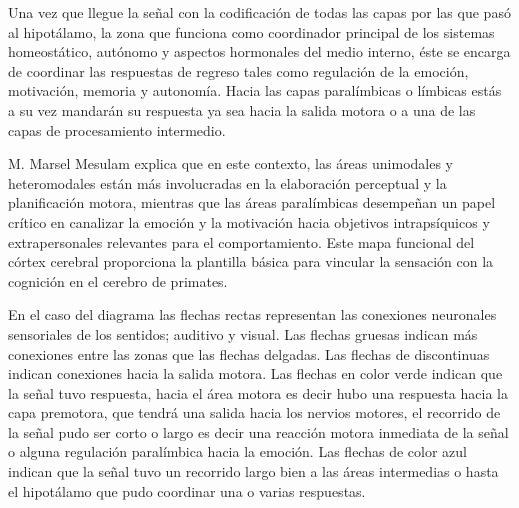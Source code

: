 Una vez que llegue la señal con la codificación de todas las capas por las que pasó al hipotálamo, la zona que funciona como coordinador principal de los sistemas homeostático, autónomo y
aspectos hormonales del medio interno, éste se encarga de coordinar las respuestas de regreso tales como regulación de la emoción, motivación, memoria y autonomía. Hacia las capas paralímbicas o límbicas estás a su vez mandarán su respuesta ya sea hacia la salida motora o a una de las capas de procesamiento intermedio.

M. Marsel Mesulam explica que en este contexto, las áreas unimodales y heteromodales están más involucradas en la elaboración perceptual y la planificación motora, mientras que las áreas paralímbicas desempeñan un papel crítico en canalizar la emoción y la motivación hacia objetivos intrapsíquicos y extrapersonales relevantes para el comportamiento. Este mapa funcional del córtex cerebral proporciona la plantilla básica para vincular la sensación con la cognición en el cerebro de primates.

En el caso del diagrama  las flechas rectas representan las conexiones neuronales sensoriales de los sentidos; auditivo y visual. Las flechas gruesas indican más conexiones entre las zonas que las flechas delgadas. Las flechas de discontinuas indican conexiones hacia la salida motora. Las flechas en color verde indican que la señal tuvo respuesta, hacia el área motora es decir hubo una respuesta hacia la capa premotora, que tendrá una salida hacia los nervios motores, el recorrido de la señal pudo ser corto o largo es decir una reacción motora inmediata de la señal o alguna regulación paralímbica hacia la emoción. Las flechas de color azul indican que la señal tuvo un recorrido largo bien a las áreas intermedias o hasta el hipotálamo que pudo coordinar una o varias respuestas. 

